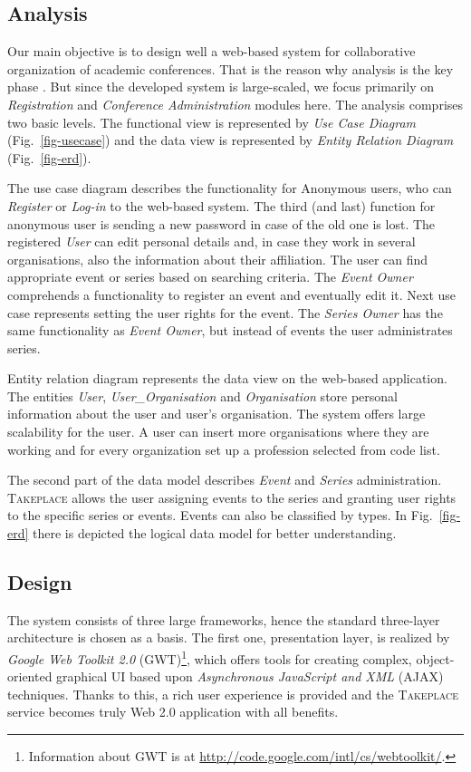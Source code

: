 \documentclass[conference]{IEEEtran}
\newcommand\tp{\textsc{Takeplace}\xspace}
\begin{document}
\subsection{Analysis}
Our main objective is to design well a web-based system for collaborative
organization of academic conferences. That is the reason why analysis is the
key phase \cite{kubicek-emergency}. But since the developed system is
large-scaled, we focus primarily on \emph{Registration} and \emph{Conference
Administration} modules here. The analysis comprises two basic levels. The
functional view is represented by \emph{Use Case Diagram}
(Fig.~\ref{fig-usecase}) and the data view is represented by \emph{Entity
Relation Diagram} (Fig.~\ref{fig-erd}).

The use case diagram describes the functionality for Anonymous users, who can
\emph{Register} or \emph{Log-in} to the web-based system. The third (and last)
function for anonymous user is sending a new password in case of the old one
is lost.  The registered \emph{User} can edit personal details and, in case
they work in several organisations, also the information about their
affiliation.  The user can find appropriate event or series based on searching
criteria. The \emph{Event Owner} comprehends a functionality to register an
event and eventually edit it. Next use case represents setting the user rights
for the event. The \emph{Series Owner} has the same functionality as
\emph{Event Owner}, but instead of events the user administrates series.

Entity relation diagram represents the data view on the web-based application.
The entities \emph{User}, \emph{User\_Organisation} and \emph{Organisation}
store personal information about the user and user's organisation. The system
offers large scalability for the user. A user can insert more organisations
where they are working and for every organization set up a profession selected
from code list.

The second part of the data model describes \emph{Event} and \emph{Series}
administration. \tp allows the user assigning events to the series and
granting user rights to the specific series or events. Events can also be
classified by types. In Fig.~\ref{fig-erd} there is depicted the logical data
model for better understanding.

\subsection{Design}
The system consists of three large frameworks, hence the standard three-layer
architecture is chosen as a basis. The first one, presentation layer, is
realized by \emph{Google Web Toolkit 2.0} (GWT)\footnote{Information about GWT
is at \url{http://code.google.com/intl/cs/webtoolkit/}.}, which offers tools
for creating complex, object-oriented graphical UI based upon
\emph{Asynchronous JavaScript and XML} (AJAX) techniques. Thanks to this, a
rich user experience is provided and the \tp service becomes truly Web 2.0
application with all benefits.
\end{document}
